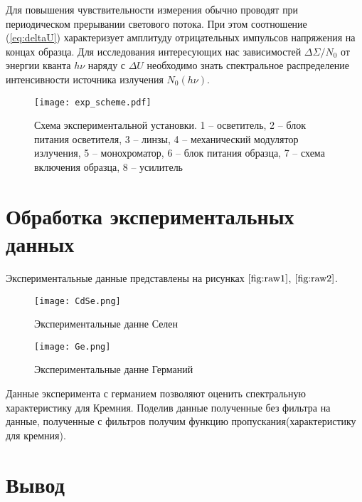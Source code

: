 \documentclass[a4paper, 14pt]{article}
\begin{document}
    Для повышения чувствительности измерения обычно проводят при периодическом прерывании светового потока. При этом соотношение (\ref{eq:deltaU}) характеризует амплитуду отрицательных импульсов напряжения на концах образца. Для исследования интересующих нас зависимостей $\Delta\Sigma/N_0$ от энергии кванта $h\nu$ наряду с $\Delta U$ необходимо знать спектральное распределение интенсивности источника излучения $N_0(h\nu)$.
    \begin{figure}[!htb]
        \centering
        \texttt{[image: exp\_scheme.pdf]}
        \caption{Схема экспериментальной установки. 1 -- осветитель, 2 -- блок питания осветителя, 3 -- линзы, 4 -- механический модулятор излучения, 5 -- монохроматор, 6 -- блок питания образца, 7 -- схема включения образца, 8 -- усилитель}
    \end{figure}

\newpage
\section*{\textcolor{header}{Обработка экспериментальных данных}}

Экспериментальные данные представлены на рисунках $\ref{fig:raw1}$, $\ref{fig:raw2}$.
\begin{figure}[htbp]
    \centering
    \texttt{[image: CdSe.png]}


    \caption{Экспериментальные данне Селен}
    \label{fig:raw1}
\end{figure}

\begin{figure}[htbp]
    \centering
    \texttt{[image: Ge.png]}
    

    \caption{Экспериментальные данне Германий}
    \label{fig:raw2}
\end{figure}

Данные эксперимента с германием позволяют оценить спектральную характеристику для Кремния.
Поделив данные полученные без фильтра на данные, полученные с фильтров получим функцию пропускания(характеристику для кремния).



\section*{\textcolor{header}{Вывод}}
\end{document}
